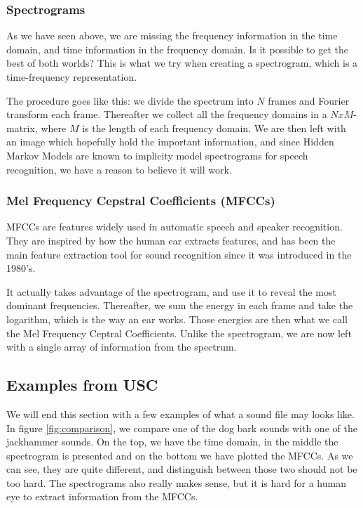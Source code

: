 \subsubsection*{Spectrograms}
As we have seen above, we are missing the frequency information in the time domain, and time information in the frequency domain. Is it possible to get the best of both worlds? This is what we try when creating a spectrogram, which is a time-frequency representation. 

The procedure goes like this: we divide the spectrum into $N$ frames and Fourier transform each frame. Thereafter we collect all the frequency domains in a $NxM$-matrix, where $M$ is the length of each frequency domain. We are then left with an image which hopefully hold the important information, and since Hidden Markov Models are known to implicity model spectrograms for speech recognition, we have a reason to believe it will work. \cite{spectrograms}

\subsubsection*{Mel Frequency Cepstral Coefficients (MFCCs)}
MFCCs are features widely used in automatic speech and speaker recognition. \cite{mfcc} They are inspired by how the human ear extracts features, and has been the main feature extraction tool for sound recognition since it was introduced in the 1980's. 

It actually takes advantage of the spectrogram, and use it to reveal the most dominant frequencies. Thereafter, we sum the energy in each frame and take the logarithm, which is the way an ear works. Those energies are then what we call the Mel Frequency Ceptral Coefficients. Unlike the spectrogram, we are now left with a single array of information from the spectrum. 

\subsection{Examples from USC}
We will end this section with a few examples of what a sound file may looks like. In figure \eqref{fig:comparison}, we compare one of the dog bark sounds with one of the jackhammer sounds. On the top, we have the time domain, in the middle the spectrogram is presented and on the bottom we have plotted the MFCCs. As we can see, they are quite different, and distinguish between those two should not be too hard. The spectrograms also really makes sense, but it is hard for a human eye to extract information from the MFCCs. 

